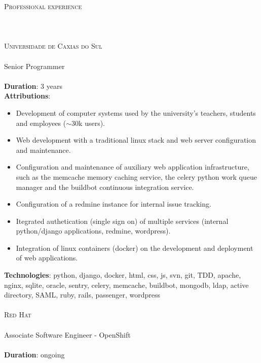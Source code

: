 \noindent
\textsc{\Huge Professional experience} \\\\\\\\
\noindent
\textsc{\Large Universidade de Caxias do Sul} \\\\
Senior Programmer \\\\
\textbf{Duration}: 3 years\\
\textbf{Attributions}:
    \begin{itemize}
            \vspace{-2.5mm}
            \itemsep-1mm
        \item Development of computer systems used by the university's
            teachers, students and employees ($\sim$30k users).
        \item Web development with a traditional linux stack and web server
            configuration and maintenance.
        \item Configuration and maintenance of auxiliary web application
            infrastructure, such as the memcache memory caching service, the
            celery python work queue manager and the buildbot continuous
            integration service.
        \item Configuration of a redmine instance for internal issue tracking.
        \item Itegrated authetication (single sign on) of multiple services
            (internal python/django applications, redmine, wordpress).
        \item Integration of linux containers (docker) on the development and
            deployment of web applications.
    \end{itemize}
\textbf{Technologies}:
    python, django, docker, html, css, js, svn, git, TDD, apache, nginx,
    sqlite, oracle, sentry, celery, memcache, buildbot, mongodb, ldap, active
    directory, SAML, ruby, rails, passenger, wordpress \\\\

\noindent
\textsc{\Large Red Hat} \\\\
Associate Software Engineer - OpenShift \\\\
\textbf{Duration}: ongoing
